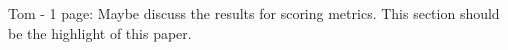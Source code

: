 Tom - 1 page: Maybe discuss the results for scoring metrics. This section should be the highlight of this paper. 